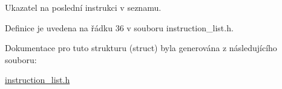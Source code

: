 Ukazatel na poslední instrukci v seznamu. 



Definice je uvedena na řádku 36 v souboru instruction\+\_\+list.\+h.



Dokumentace pro tuto strukturu (struct) byla generována z následujícího souboru\+:\begin{DoxyCompactItemize}
\item 
\hyperlink{instruction__list_8h}{instruction\+\_\+list.\+h}\end{DoxyCompactItemize}
